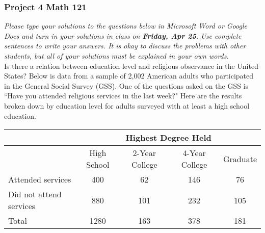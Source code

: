 \documentclass[12pt]{exam}
\begin{document}
\subsubsection*{Project 4 \hfill Math 121}

\textit{Please type your solutions to the questions below in Microsoft Word or Google Docs and turn in your solutions in class on \textbf{Friday, Apr 25}. Use complete sentences to write your answers. It is okay to discuss the problems with other students, but all of your solutions must be explained in your own words. } \\

\noindent
Is there a relation between education level and religious observance in the United States? Below is data from a sample of 2{,}002 American adults who participated in the General Social Survey (GSS).
One of the questions asked on the GSS is ``Have you attended religious services in the last week?"  Here are the results broken down by education level for adults surveyed with at least a high school education. 

\begin{center}
\begin{tabular}{l|cccc} 
& \multicolumn{4}{c}{Highest Degree Held} \\ \hline 
 & High School & 2-Year College & 4-Year College & Graduate \\ \hline
Attended services & 400 & 62 & 146 & 76 \\
Did not attend services & 880 & 101 & 232 & 105 \\ \hline
Total & 1280 & 163 & 378 & 181 \\ 
\end{tabular}
\end{center}
\end{document}
